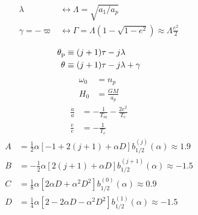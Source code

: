 \documentclass[12pt]{extarticle}
\begin{document}
\begin{minipage}[t]{0.5\linewidth}
  \begin{align*}
    \lambda &\longleftrightarrow \Lambda = \sqrt{a_1/a_p} \\
    \gamma=-\varpi &\longleftrightarrow \Gamma =\Lambda(1-\sqrt{1-e^2})\approx \Lambda \frac{e^2}{2} \\
    \end{align*}
    \begin{align*}
      \theta_{\rm p} & \equiv(j+1)\tau - j\lambda \\
      \theta_{\rm} &\equiv(j+1)\tau - j\lambda + \gamma
  \end{align*}
  \begin{align*}
   \omega_0 &= n_p  \\
    H_0 &= \frac{GM}{a_p} 
  \end{align*}
  \begin{align*}
    \frac{\dot{a}}{a} &= -\frac{1}{T_m} - \frac{2e^2}{T_e}\\
    \frac{\dot{e}}{e} &= - \frac{1}{T_e}
  \end{align*}
  \begin{align*}
    A &= \frac12\alpha[-1+2(j+1)+\alpha D]b_{1/2}^{(j)}(\alpha) \approx 1.9\\
    B &=  -\frac12\alpha[2(j+1)+\alpha D]b_{1/2}^{(j+1)}(\alpha) \approx -1.5 \\
    C &= \frac18\alpha[2\alpha D + \alpha^2 D^2]b_{1/2}^{(0)}(\alpha) \approx 0.9\\
    D &= \frac14\alpha[2-2\alpha D - \alpha^2 D^2]b_{1/2}^{(1)}(\alpha)\approx -1.5 
  \end{align*}
\end{minipage}
\newpage
\end{document}
